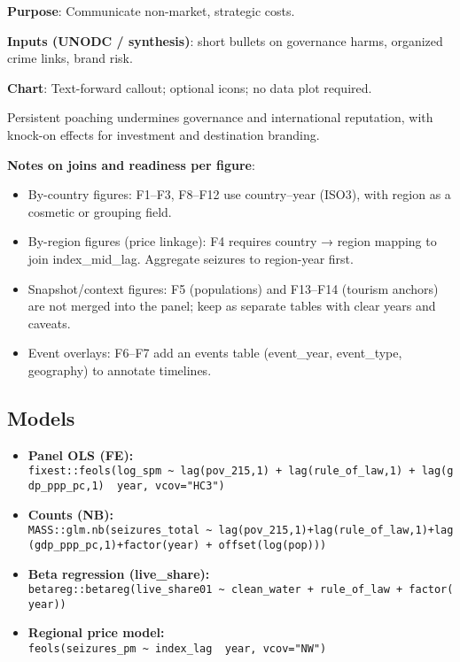 \documentclass[
]{article}
\providecommand{\tightlist}{%
  \setlength{\itemsep}{0pt}\setlength{\parskip}{0pt}}
\begin{document}
\textbf{Purpose}: Communicate non-market, strategic costs.

\textbf{Inputs (UNODC / synthesis)}: short bullets on governance harms,
organized crime links, brand risk.

\textbf{Chart}: Text-forward callout; optional icons; no data plot
required.

Persistent poaching undermines governance and international reputation,
with knock-on effects for investment and destination branding.

\textbf{Notes on joins and readiness per figure}:

\begin{itemize}
\item
  By-country figures: F1--F3, F8--F12 use country--year (ISO3), with
  region as a cosmetic or grouping field.
\item
  By-region figures (price linkage): F4 requires country → region
  mapping to join index\_mid\_lag. Aggregate seizures to region-year
  first.
\item
  Snapshot/context figures: F5 (populations) and F13--F14 (tourism
  anchors) are not merged into the panel; keep as separate tables with
  clear years and caveats.
\item
  Event overlays: F6--F7 add an events table (event\_year, event\_type,
  geography) to annotate timelines.
\end{itemize}

\subsection{Models}\label{models}

\begin{itemize}
\tightlist
\item
  \textbf{Panel OLS (FE):}
  \texttt{fixest::feols(log\_spm\ \textasciitilde{}\ lag(pov\_215,1)\ +\ lag(rule\_of\_law,1)\ +\ lag(gdp\_ppp\_pc,1)\ \textbar{}\ year,\ vcov="HC3")}
\item
  \textbf{Counts (NB):}
  \texttt{MASS::glm.nb(seizures\_total\ \textasciitilde{}\ lag(pov\_215,1)+lag(rule\_of\_law,1)+lag(gdp\_ppp\_pc,1)+factor(year)\ +\ offset(log(pop)))}
\item
  \textbf{Beta regression (live\_share):}
  \texttt{betareg::betareg(live\_share01\ \textasciitilde{}\ clean\_water\ +\ rule\_of\_law\ +\ factor(year))}
\item
  \textbf{Regional price model:}
  \texttt{feols(seizures\_pm\ \textasciitilde{}\ index\_lag\ \textbar{}\ year,\ vcov="NW")}
\end{itemize}
\end{document}
